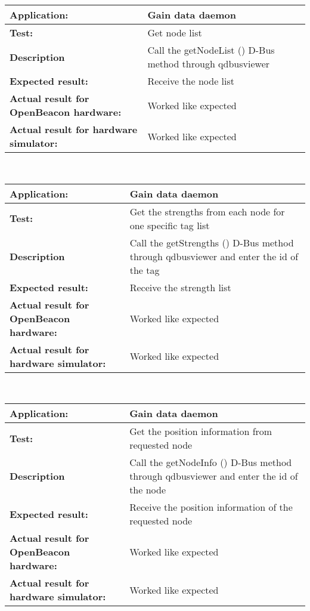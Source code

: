    \begin{tabular}{|p{3.5cm}|p{10.5cm}|}
    \hline
     \textbf{Application:}				& Gain data daemon\\
    \hline
     \textbf{Test:}					& Get node list\\
    \hline
     \textbf{Description}				& Call the getNodeList () D-Bus method through qdbusviewer\\
    \hline
     \textbf{Expected result:}				& Receive the node list\\
    \hline
     \textbf{Actual result for OpenBeacon hardware:}	& Worked like expected\\
    \hline
     \textbf{Actual result for hardware simulator:}	& Worked like expected\\
    \hline
   \end{tabular}\\
   \begin{tabular}{|p{3.5cm}|p{10.5cm}|}
    \hline
     \textbf{Application:}				& Gain data daemon\\
    \hline
     \textbf{Test:}					& Get the strengths from each node for one specific tag list\\
    \hline
     \textbf{Description}				& Call the getStrengths () D-Bus method through qdbusviewer and enter the id of the tag\\
    \hline
     \textbf{Expected result:}				& Receive the strength list\\
    \hline
     \textbf{Actual result for OpenBeacon hardware:}	& Worked like expected\\
    \hline
     \textbf{Actual result for hardware simulator:}	& Worked like expected\\
    \hline
   \end{tabular}\\
   \begin{tabular}{|p{3.5cm}|p{10.5cm}|}
    \hline
     \textbf{Application:}				& Gain data daemon\\
    \hline
     \textbf{Test:}					& Get the position information from requested node\\
    \hline
     \textbf{Description}				& Call the getNodeInfo () D-Bus method through qdbusviewer and enter the id of the node\\
    \hline
     \textbf{Expected result:}				& Receive the position information of the requested node\\
    \hline
     \textbf{Actual result for OpenBeacon hardware:}	& Worked like expected\\
    \hline
     \textbf{Actual result for hardware simulator:}	& Worked like expected\\
    \hline
   \end{tabular}\\
